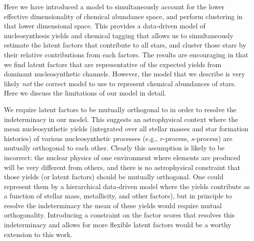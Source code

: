 \documentclass[twocolumn]{aastex62}
\begin{document}
Here we have introduced a model to simultaneously account for the lower
effective dimensionality of chemical abundance space, and perform clustering
in that lower dimensional space. This provides a data-driven model of
nucleosynthesis yields and chemical tagging that allows us to simultaneously
estimate the latent factors that contribute to all stars, and cluster those 
stars by their relative contributions from each factors. The results are
encouraging in that we find latent factors that are representative of the
expected yields from dominant nucleosynthetic channels. However, the model that
we describe is very likely \emph{not} the correct model to use to represent 
chemical abundances of stars. Here we discuss the limitations of our model 
in detail.


We require latent factors to be mutually orthogonal to in order to resolve
the indeterminacy in our model. This suggests an astrophysical context where 
the mean nucleosynthetic yields (integrated over all stellar masses and star
formation histories) of various nucleosynthetic processes (e.g., $r$-process, 
$s$-process) are mutually orthogonal to each other. Clearly this assumption 
is likely to be incorrect: the nuclear physics
of one environment where elements are produced will be very different from
others, and there is no astrophysical constraint that those
yields (or latent factors) should be mutually orthogonal.
One could represent them by a hierarchical data-driven model where the yields contribute as a function of stellar mass, 
metallicity, and other factors), but in principle to resolve the indeterminacy
the mean of these yields would require mutual orthogonality. Introducing a constraint on the factor scores that resolves this indeterminacy and allows for more flexible latent factors would be a worthy extension to this work.
\end{document}
